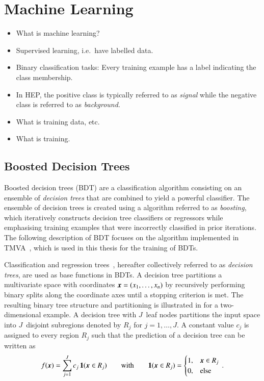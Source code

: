 \section{Machine Learning}

\begin{itemize}
\item What is machine learning?
\item Supervised learning, i.e.\ have labelled data.
\item Binary classification tasks: Every training example has a label indicating
  the class membership.
\item In HEP, the positive class is typically referred to as \emph{signal} while
  the negative class is referred to as \emph{background}.
\item What is training data, etc.
\item What is training.
\end{itemize}


\subsection{Boosted Decision Trees}

Boosted decision trees (BDT) are a classification algorithm consisting on an
ensemble of \emph{decision trees} that are combined to yield a powerful
classifier. The ensemble of decision trees is created using a algorithm referred
to as \emph{boosting}, which iteratively constructs decision tree classifiers or
regressors while emphasising training examples that were incorrectly classified
in prior iterations. The following description of BDT focuses on the algorithm
implemented in \textsc{TMVA}~\cite{TMVA}, which is used in this thesis for the
training of BDTs.


Classification and regression trees~\cite{Breiman:1984jka,hastie09}, hereafter
collectively referred to as \emph{decision trees}, are used as base functions in
BDTs. A decision tree partitions a multivariate space with coordinates
$\myvec{x} = (x_1, \dots, x_n)$ by recursively performing binary splits along
the coordinate axes until a stopping criterion is met. The resulting binary tree
structure and partitioning is illustrated in  for a
two-dimensional example. A decision tree with $J$~leaf nodes partitions the
input space into $J$~disjoint subregions denoted by $R_j$ for $j = 1, \dots,
J$. A constant value $c_j$ is assigned to every region $R_j$ such that the
prediction of a decision tree can be written as~\cite{hastie09}
\begin{align*}
  f(\myvec{x}) = \sum_{j = 1}^{J} c_j \, \mathbf{1}(\myvec{x} \in R_j) \qquad \text{with} \qquad \mathbf{1}(\myvec{x} \in R_j) =
  \begin{cases}
    1, & \myvec{x} \in R_j \\
    0, & \text{else}
  \end{cases} \,\text{.}
\end{align*}

